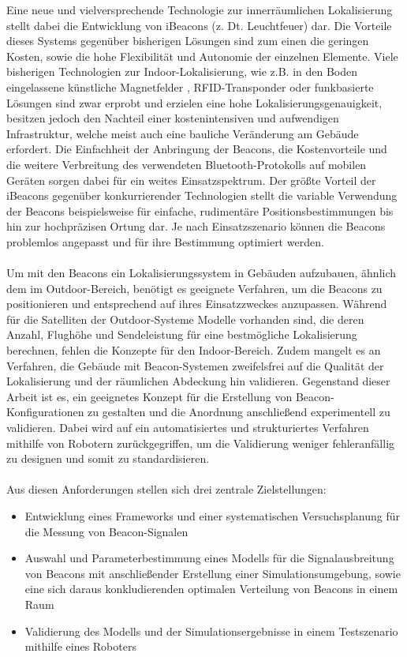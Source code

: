 Eine neue und vielversprechende Technologie zur innerräumlichen Lokalisierung stellt dabei die Entwicklung von iBeacons (z. Dt. Leuchtfeuer) dar. Die Vorteile dieses Systems gegenüber bisherigen Lösungen sind zum einen die geringen Kosten, sowie die hohe Flexibilität und Autonomie der einzelnen Elemente. Viele bisherigen Technologien zur Indoor-Lokalisierung, wie z.B. in den Boden eingelassene künstliche Magnetfelder \cite{Magnet}, RFID-Transponder \cite{RFID} oder funkbasierte Lösungen\citep{WLAN} sind zwar erprobt und erzielen eine hohe Lokalisierungsgenauigkeit, besitzen jedoch den Nachteil einer kostenintensiven und aufwendigen Infrastruktur, welche meist auch eine bauliche Veränderung am Gebäude erfordert. Die Einfachheit der Anbringung der Beacons, die Kostenvorteile und die weitere Verbreitung des verwendeten Bluetooth-Protokolls auf mobilen Geräten sorgen dabei für ein weites Einsatzspektrum. Der größte Vorteil der iBeacons gegenüber konkurrierender Technologien stellt die variable Verwendung der Beacons beispielsweise für einfache, rudimentäre Positionsbestimmungen bis hin zur hochpräzisen Ortung dar. Je nach Einsatzszenario können die Beacons problemlos angepasst und für ihre Bestimmung optimiert werden.\\ \\
Um mit den Beacons ein Lokalisierungssystem in Gebäuden aufzubauen, ähnlich dem im Outdoor-Bereich, benötigt es geeignete Verfahren, um die Beacons zu positionieren und entsprechend auf ihres Einsatzzweckes anzupassen. Während für die Satelliten der Outdoor-Systeme Modelle vorhanden sind, die deren Anzahl, Flughöhe und Sendeleistung für eine bestmögliche Lokalisierung berechnen, fehlen die Konzepte für den Indoor-Bereich. Zudem mangelt es an Verfahren, die Gebäude mit Beacon-Systemen zweifelsfrei auf die Qualität der Lokalisierung und der räumlichen Abdeckung hin validieren. Gegenstand dieser Arbeit ist es, ein geeignetes Konzept für die Erstellung von Beacon-Konfigurationen zu gestalten und die Anordnung anschließend experimentell zu validieren. Dabei wird auf ein automatisiertes und strukturiertes Verfahren mithilfe von Robotern zurückgegriffen, um die Validierung weniger fehleranfällig zu designen und somit zu standardisieren.\\ \\
Aus diesen Anforderungen stellen sich drei zentrale Zielstellungen:
\begin{itemize}
\item Entwicklung eines Frameworks und einer systematischen Versuchsplanung für die Messung von Beacon-Signalen
\item Auswahl und Parameterbestimmung eines Modells für die Signalausbreitung von Beacons mit anschließender Erstellung einer Simulationsumgebung, sowie eine sich daraus konkludierenden optimalen Verteilung von Beacons in einem Raum 
\item Validierung des Modells und der Simulationsergebnisse in einem Testszenario mithilfe eines Roboters  
\end{itemize}

